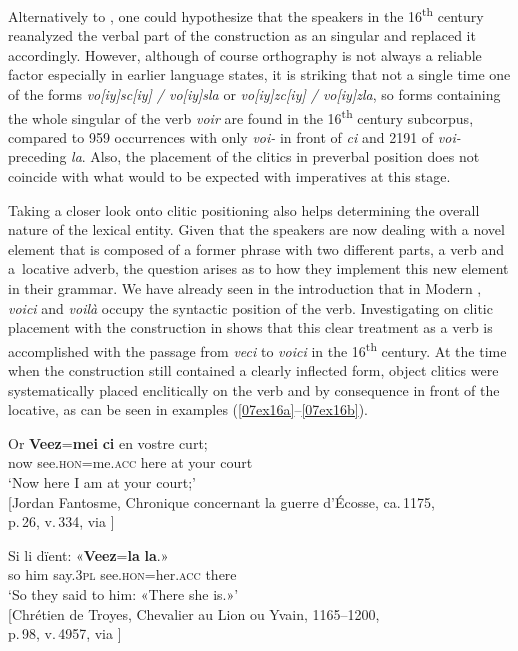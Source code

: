 \documentclass[output=paper,colorlinks,citecolor=brown]{langscibook}
\begin{document}
Alternatively to , one could hypothesize that the speakers in the 16\textsuperscript{th} century reanalyzed the verbal part of the construction as an  singular and replaced it accordingly. However, although of course orthography is not always a reliable factor especially in earlier language states, it is striking that not a single time one of the forms \emph{vo[iy]sc[iy] / vo[iy]sla} or \emph{vo[iy]zc[iy] / vo[iy]zla}, so forms containing the whole  singular of the verb \emph{voir} are found in the 16\textsuperscript{th} century subcorpus, compared to 959 occurrences with only \emph{voi-} in front of \emph{ci} and 2191 of \emph{voi-} preceding \emph{la}. Also, the placement of the clitics in preverbal position does not coincide with what would to be expected with imperatives at this stage.

Taking a closer look onto clitic positioning also helps determining the overall nature of the lexical entity. Given that the speakers are now dealing with a novel element that is composed of a former phrase with two different parts, a verb and a~locative adverb, the question arises as to how they implement this new element in their grammar. We have already seen in the introduction that in Modern , \emph{voici} and \emph{voilà} occupy the syntactic position of the verb. Investigating on clitic placement with the  construction in  shows that this clear treatment as a verb is accomplished with the passage from \emph{veci} to \emph{voici} in the 16\textsuperscript{th} century. At the time when the  construction still contained a clearly inflected form, object clitics were systematically placed enclitically on the verb and by consequence in front of the locative, as can be seen in examples (\ref{07ex16a}--\ref{07ex16b}).

\begin{exe}
	\ex \label{07ex16}
	\begin{xlist}
		\ex \label{07ex16a} \gll Or \textbf{Veez}=\textbf{mei} \textbf{ci} en vostre curt; \\
		now see.\textsc{hon}=me.\textsc{acc} here at your court \\
		\trans ‘Now here I am at your court;’ \\
		\hfill [Jordan Fantosme, Chronique concernant la guerre d'Écosse, ca. 1175, \\
		\hfill p. 26, v. 334, via \cite{bfm2019}]
		
		\ex \label{07ex16b} \gll Si li dïent: «\textbf{Veez}=\textbf{la} \textbf{la}.» \\
		so him say.\textsc{3pl} see.\textsc{hon}=her.\textsc{acc} there \\
		\trans ‘So they said to him: «There she is.»’ \\
		\hfill [Chrétien de Troyes, Chevalier au Lion ou Yvain, 1165–1200, \\
		\hfill p. 98, v. 4957, via \cite{bfm2019}]
	\end{xlist}
\end{exe}
\end{document}
